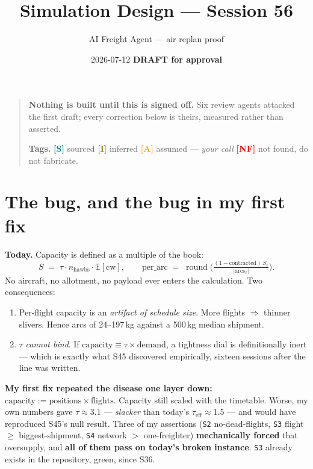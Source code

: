 \documentclass[11pt,a4paper]{article}
\title{\bfseries Simulation Design --- Session 56}
\author{AI Freight Agent --- air replan proof}
\date{2026-07-12 \quad\textbf{DRAFT for approval}}
\newcommand{\src}[1]{\texttt{\small #1}}
\newcommand{\tagS}{\textcolor{teal}{\textbf{[S]}}}
\newcommand{\tagI}{\textcolor{olive}{\textbf{[I]}}}
\newcommand{\tagA}{\textcolor{orange}{\textbf{[A]}}}
\newcommand{\tagNF}{\textcolor{red}{\textbf{[NF]}}}
\begin{document}
\maketitle

\begin{quote}
\textbf{Nothing is built until this is signed off.} Six review agents attacked the first draft; every
correction below is theirs, measured rather than asserted.

\textbf{Tags.} \tagS{} sourced \quad \tagI{} inferred \quad \tagA{} assumed --- \emph{your call} \quad
\tagNF{} not found, do not fabricate.
\end{quote}

\section{The bug, and the bug in my first fix}

\textbf{Today.} Capacity is defined as a multiple of the book:
\[
S \;=\; \tau \cdot n_{\text{hawbs}} \cdot \mathbb{E}[\mathrm{cw}],
\qquad
\text{per\_arc} \;=\; \operatorname{round}\!\Big(\tfrac{(1-\text{contracted})\, S_{\ell}}{|\text{arcs}_{\ell}|}\Big).
\]
No aircraft, no allotment, no payload ever enters the calculation. Two consequences:

\begin{enumerate}[leftmargin=*,itemsep=1pt]
  \item Per-flight capacity is an \emph{artifact of schedule size}. More flights $\Rightarrow$ thinner
        slivers. Hence arcs of 24--197\,kg against a 500\,kg median shipment.
  \item $\tau$ \emph{cannot bind}. If $\text{capacity} \equiv \tau \times \text{demand}$, a tightness dial is
        definitionally inert --- which is exactly what S45 discovered empirically, sixteen sessions after
        the line was written.
\end{enumerate}

\textbf{My first fix repeated the disease one layer down:}
$\text{capacity} := \text{positions} \times \text{flights}$. Capacity still scaled with the timetable.
Worse, my own numbers gave $\tau \approx 3.1$ --- \emph{slacker} than today's $\tau_{\text{eff}} \approx 1.5$
--- and would have reproduced S45's null result. Three of my assertions (\src{S2} no-dead-flights,
\src{S3} flight $\geq$ biggest-shipment, \src{S4} network $>$ one-freighter) \textbf{mechanically forced}
that oversupply, and \textbf{all of them pass on today's broken instance}. \src{S3} already exists in the
repository, green, since S36.
\end{document}
